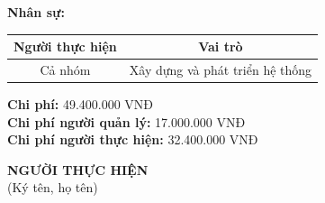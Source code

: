 {\begin{minipage}{\textwidth}
\begin{itemize}
    \end{itemize}
    \vspace{0.5cm}
    \noindent \textbf{Nhân sự:}
    \begin{longtable}{|c|c|}
    \hline
    \textbf{Người thực hiện} & \textbf{Vai trò} \\
    \hline
    Cả nhóm & Xây dựng và phát triển hệ thống \\
    \hline
    \end{longtable}
    \vspace{0.5cm}
    \noindent \textbf{Chi phí:} 49.400.000 VNĐ \\
    \textbf{Chi phí người quản lý:} 17.000.000 VNĐ \\
    \textbf{Chi phí người thực hiện:} 32.400.000 VNĐ \\
    \vspace{1cm}
    \begin{flushleft}
        \hspace{8cm} \textbf{NGƯỜI THỰC HIỆN} \\
        \hspace{8.8cm} (Ký tên, họ tên) \\
        \vspace{1cm}
    \end{flushleft}
    \end{minipage}
}
% 
